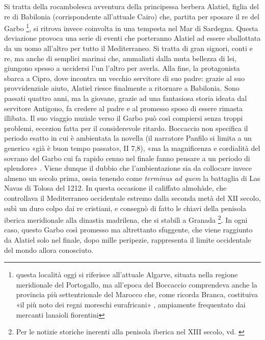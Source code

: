 Si tratta della rocambolesca avventura della principessa berbera
Alatiel, figlia del re di Babilonia (corrispondente all'attuale Cairo)
che, partita per sposare il re del Garbo \footnote{questa località oggi
  si riferisce all'attuale Algarve, situata nella regione meridionale
  del Portogallo, ma all'epoca del Boccaccio comprendeva anche la
  provincia più settentrionale del Marocco che, come ricorda Branca,
  costituiva «il più noto dei regni moreschi eurafricani»
  \autocite[p.~227]{brancadecameron}, ampiamente frequentato dai
  mercanti lanaioli fiorentini}, si ritrova invece coinvolta in una
tempesta nel Mar di Sardegna. Questa deviazione provoca una serie di
eventi che porteranno Alatiel ad essere sballottata da un uomo all'altro
per tutto il Mediterraneo. Si tratta di gran signori, conti e re, ma
anche di semplici marinai che, ammaliati dalla muta bellezza di lei,
giungono spesso a uccidersi l'un l'altro per averla. Alla fine, la
protagonista sbarca a Cipro, dove incontra un vecchio servitore di suo
padre: grazie al suo provvidenziale aiuto, Alatiel riesce finalmente a
ritornare a Babilonia. Sono passati quattro anni, ma la giovane, grazie
ad una fantasiosa storia ideata dal servitore Antigono, fa credere al
padre e al promesso sposo di essere rimasta illibata. Il suo viaggio
nuziale verso il Garbo può così compiersi senza troppi problemi,
eccezion fatta per il considerevole ritardo. Boccaccio non specifica il
periodo esatto in cui è ambientata la novella (il narratore Panfilo si
limita a un generico «già è buon tempo passato», II 7,8), «ma la
magnificenza e cordialità del sovrano del Garbo cui fa rapido cenno nel
finale fanno pensare a un periodo di splendore»
\autocite[p.~91]{pegoretti2011}. Viene dunque il dubbio che
l'ambientazione sia da collocare invece almeno un secolo prima, ossia
tenendo come \emph{terminus ad quem} la battaglia di Las Navas di Tolosa
del 1212. In questa occasione il califfato almohàde, che controllava il
Mediterraneo occidentale estremo dalla seconda metà del XII secolo, subì
un duro colpo dai re cristiani, e consegnò di fatto le chiavi della
penisola iberica meridionale alla dinastia madrilena, che si stabilì a
Granada \footnote{Per le notizie storiche inerenti alla penisola iberica
  nel XIII secolo, vd. \autocite{abulafia2011}}. In ogni caso, questo
Garbo così promesso ma altrettanto sfuggente, che viene raggiunto da
Alatiel solo nel finale, dopo mille peripezie, rappresenta il limite
occidentale del mondo allora conosciuto.

